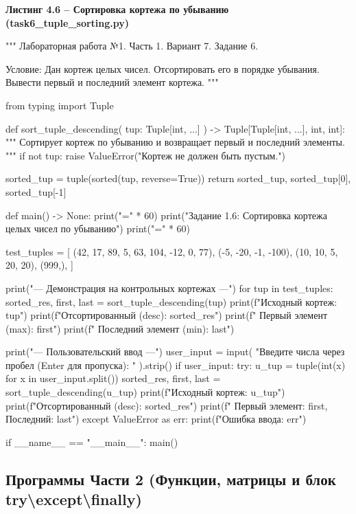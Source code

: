 \documentclass[14pt,a4paper]{extarticle}
\newcommand{\listingtitle}[1]{%
  \par\vspace{8pt}%
  \noindent\hspace*{1.25cm}\textbf{#1}\par\vspace{2pt}%
}
\begin{document}
\listingtitle{Листинг 4.6 -- Сортировка кортежа по убыванию (task6\_tuple\_sorting.py)}
\begin{CodeListing}
"""
Лабораторная работа №1. Часть 1.
Вариант 7. Задание 6.

Условие:
Дан кортеж целых чисел. Отсортировать его в порядке убывания.
Вывести первый и последний элемент кортежа.
"""

from typing import Tuple


def sort_tuple_descending(
    tup: Tuple[int, ...]
) -> Tuple[Tuple[int, ...], int, int]:
    """
    Сортирует кортеж по убыванию и возвращает первый и последний элементы.
    """
    if not tup:
        raise ValueError("Кортеж не должен быть пустым.")

    sorted_tup = tuple(sorted(tup, reverse=True))
    return sorted_tup, sorted_tup[0], sorted_tup[-1]


def main() -> None:
    print("=" * 60)
    print("Задание 1.6: Сортировка кортежа целых чисел по убыванию")
    print("=" * 60)

    test_tuples = [
        (42, 17, 89, 5, 63, 104, -12, 0, 77),
        (-5, -20, -1, -100),
        (10, 10, 5, 20, 20),
        (999,),
    ]

    print("\n--- Демонстрация на контрольных кортежах ---")
    for tup in test_tuples:
        sorted_res, first, last = sort_tuple_descending(tup)
        print(f"Исходный кортеж:       {tup}")
        print(f"Отсортированный (desc): {sorted_res}")
        print(f"  Первый элемент (max): {first}")
        print(f"  Последний элемент (min): {last}\n")

    print("--- Пользовательский ввод ---")
    user_input = input(
        "Введите числа через пробел (Enter для пропуска): "
    ).strip()
    if user_input:
        try:
            u_tup = tuple(int(x) for x in user_input.split())
            sorted_res, first, last = sort_tuple_descending(u_tup)
            print(f"Исходный кортеж:       {u_tup}")
            print(f"Отсортированный (desc): {sorted_res}")
            print(f"  Первый элемент: {first}, Последний: {last}")
        except ValueError as err:
            print(f"Ошибка ввода: {err}")


if __name__ == "__main__":
    main()
\end{CodeListing}

\subsection{Программы Части 2 (Функции, матрицы и блок try\textbackslash{}except\textbackslash{}finally)}
\end{document}
